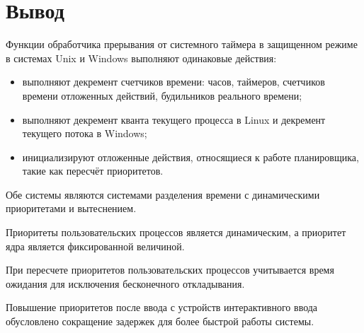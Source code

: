\section*{Вывод}

    Функции обработчика прерывания от системного таймера в защищенном режиме в системах Unix и Windows выполняют одинаковые действия:

    \begin{itemize} 
    	\item выполняют декремент счетчиков времени: часов, таймеров, счетчиков времени отложенных действий, будильников реального времени;
    	\item выполняют декремент кванта текущего процесса в Linux и декремент текущего потока в Windows;
    	\item инициализируют отложенные действия, относящиеся к работе планировщика, такие как пересчёт приоритетов.
    \end{itemize} 
    
    Обе системы являются системами разделения времени с динамическими приоритетами и вытеснением. 
    
    Приоритеты пользовательских процессов является динамическим, а приоритет ядра является фиксированной величиной.

    При пересчете приоритетов пользовательских процессов учитывается время ожидания для исключения бесконечного откладывания.

    Повышение приоритетов после ввода с устройств интерактивного ввода обусловлено сокращение задержек для более быстрой работы системы.
